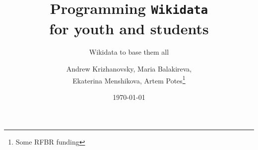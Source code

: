 \documentclass[
	fontsize=10pt, %
	twoside=false, %
	numbers=noenddot, %
]{kaobook}
\begin{document}

\titlehead{The \texttt{kaobook} class}
\subject{Petrozavodsk State University}

\title[Programming Wikidata for youth and students]{Programming {\normalfont\texttt{Wikidata}} \\ for youth and students}

\subtitle{Wikidata to base them all}

\author[Andrew Krizhanovsky, Maria Balakireva, \\ Ekaterina Menshikova, Artem Potes]{Andrew Krizhanovsky, Maria Balakireva, \\ Ekaterina Menshikova, Artem Potes\thanks{Some RFBR funding}}

\date{\today}

\publishers{An Awesome Publisher}


\frontmatter %




\makeatletter
\uppertitleback{\@titlehead} %
\end{document}

